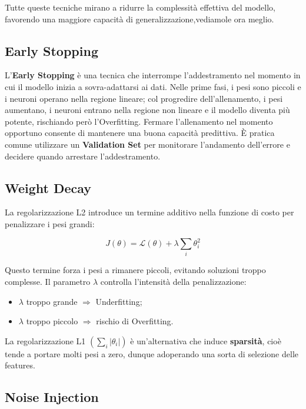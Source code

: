 Tutte queste tecniche mirano a ridurre la complessità effettiva del modello, favorendo una maggiore capacità di generalizzazione,vediamole ora meglio.

\subsection{Early Stopping}

L’\textbf{Early Stopping} è una tecnica che interrompe l’addestramento nel momento in cui il modello inizia a sovra-adattarsi ai dati. Nelle prime fasi, i pesi sono piccoli e i neuroni operano nella regione lineare; col progredire dell’allenamento, i pesi aumentano, i neuroni entrano nella regione non lineare e il modello diventa più potente, rischiando però l’Overfitting. Fermare l’allenamento nel momento opportuno consente di mantenere una buona capacità predittiva. È pratica comune utilizzare un \textbf{Validation Set} per monitorare l’andamento dell’errore e decidere quando arrestare l’addestramento.

\subsection{Weight Decay}

La regolarizzazione L2 introduce un termine additivo nella funzione di costo per penalizzare i pesi grandi:

\begin{equation}
J(\theta) = \mathcal{L}(\theta) + \lambda \sum_i \theta_i^2
\end{equation}

Questo termine forza i pesi a rimanere piccoli, evitando soluzioni troppo complesse. Il parametro $\lambda$ controlla l’intensità della penalizzazione:

\begin{itemize}
\item $\lambda$ troppo grande $\Rightarrow$ Underfitting;
\item $\lambda$ troppo piccolo $\Rightarrow$ rischio di Overfitting.
\end{itemize}

La regolarizzazione L1 $ (\sum_i |\theta_i|)$ è un’alternativa che induce \textbf{sparsità}, cioè tende a portare molti pesi a zero, dunque adoperando una sorta di selezione delle features.

\subsection{Noise Injection}

